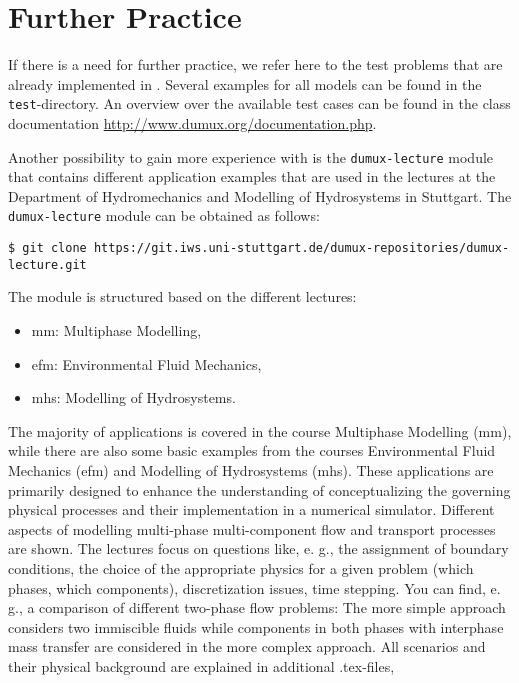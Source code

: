 \section{Further Practice}
\label{tutorial-furtherpractice}

If there is a need for further practice, we refer here to the test problems that
are already implemented in \Dumux. Several examples for all models
can be found in the \texttt{test}-directory. An overview over the available test
cases can be found in the class documentation \url{http://www.dumux.org/documentation.php}.

Another possibility to gain more experience with \Dumux is the \texttt{dumux-lecture} module
that contains different application examples that are used in the lectures at the 
Department of Hydromechanics and Modelling of Hydrosystems in Stuttgart.
The \texttt{dumux-lecture} module can be obtained as follows:
\begin{lstlisting}[style=Bash]
$ git clone https://git.iws.uni-stuttgart.de/dumux-repositories/dumux-lecture.git
\end{lstlisting}
The module is structured based on the different lectures: 
\begin{itemize}
\item mm: Multiphase Modelling,
\item efm: Environmental Fluid Mechanics,
\item mhs: Modelling of Hydrosystems.
\end{itemize}
The majority of applications is covered in the course Multiphase Modelling (mm), 
while there are also some basic examples from the
courses Environmental Fluid Mechanics (efm) and Modelling of Hydrosystems (mhs). 
These applications are primarily designed to enhance the understanding of conceptualizing the
governing physical processes and their implementation in a numerical simulator. 
Different aspects of modelling multi-phase multi-component flow and transport processes are shown.
The lectures focus on questions like, e. g., the assignment of boundary conditions, the choice of the 
appropriate physics for a given problem (which phases, which components), discretization issues,
time stepping. You can find, e. g., a comparison of different two-phase flow problems: The
more simple approach considers two immiscible fluids while components in both phases with interphase
mass transfer are considered in the more complex approach.
All scenarios and their physical background are explained in additional .tex-files,
